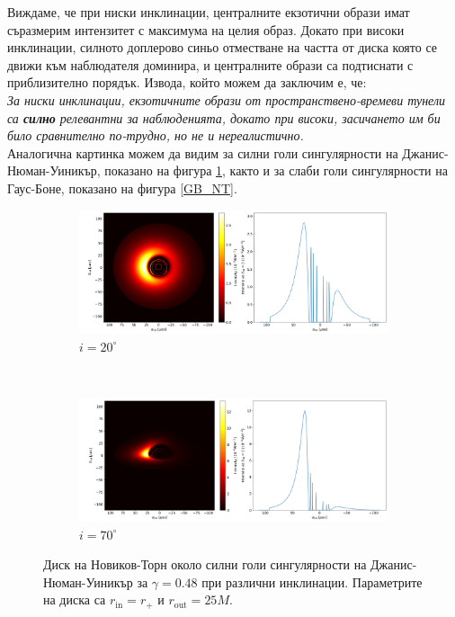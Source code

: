 Виждаме, че при ниски инклинации, централните екзотични образи имат съразмерим интензитет с максимума на целия образ. Докато при високи инклинации, силното доплерово синьо отместване на частта от диска която се движи към наблюдателя доминира, и централните образи са подтиснати с приблизително порядък. Извода, който можем да заключим е, че:\\

\emph{За ниски инклинации, екзотичните образи от пространствено-времеви тунели са \textbf{силно} релевантни за наблюденията, докато при високи, засичането им би било сравнително по-трудно, но не и нереалистично.} \\

Аналогична картинка можем да видим за силни голи сингулярности на Джанис-Нюман-Уиникър, показано на фигура \ref{JNW_NT}, както и за слаби голи сингулярности на Гаус-Боне, показано на фигура \ref{GB_NT}.

\newpage
\begin{figure}[!htb]
	\begin{subfigure}{12cm}
		\hspace{-0.6cm}
		\includegraphics[scale = 0.26]{JNW_NT_Gamma0.48_20_deg.png}
		\caption{$i = 20^\circ$} 
	\end{subfigure}\\
	\begin{subfigure}{12cm}
		\hspace{-0.6cm}
		\includegraphics[scale = 0.26]{JNW_NT_Gamma0.48_70_deg.png}
		\caption{$i = 70^\circ$} 
	\end{subfigure}
	\caption[Диск на Новиков-Торн около силни голи сингулярности на Джанис-Нюман-Уиникър при различни инклинации.]{\small Диск на Новиков-Торн около силни голи сингулярности на Джанис-Нюман-Уиникър за $\gamma = 0.48$ при различни инклинации. Параметрите на диска са $r_\text{in} = r_\text{+}$ и $r_\text{out} = 25M$.} 
	\label{JNW_NT}
\end{figure}


